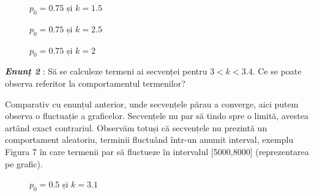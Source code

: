 \documentclass[a4paper,12pt]{article}
\begin{document}
\begin{figure}
\centering
{}
\caption{$p_0 = 0.75$ și $k=1.5$}
\end{figure}

\begin{figure}
\centering
{}
\caption{$p_0 = 0.75$ și $k=2.5$}
\end{figure}

\begin{figure}
\centering
{}
\caption{$p_0 = 0.75$ și $k=2$}
\end{figure}

\pagebreak

\textit{\textbf{Enunț 2}} : Să se calculeze termeni ai secvenței pentru $3 < k <3.4$. Ce se poate observa referitor la comportamentul termenilor?

Comparativ cu enunțul anterior, unde secvențele părau a converge, aici putem observa o fluctuație a graficelor. Secvențele nu par să tindo spre o limită, avestea artând exact contrariul. Observăm totuși că secvențele nu prezintă un comportament aleatoriu, terminii fluctuând într-un anumit interval, exemplu Figura 7 în care termenii par să fluctueze în intervalul [5000,8000] (reprezentarea pe grafic).

\begin{figure}[h!]
\centering
{}
\caption{$p_0 = 0.5$ și $k=3.1$}
\end{figure}
\end{document}
